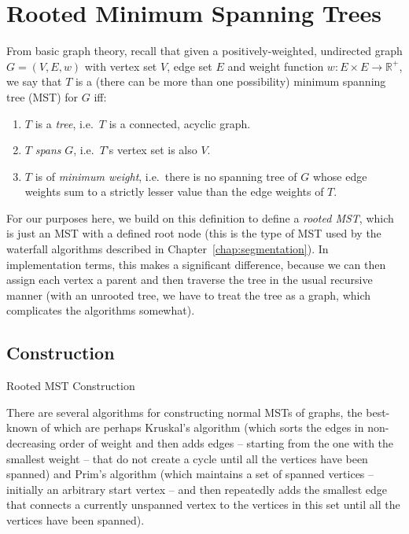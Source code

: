 \afterpage{\clearpage}
\newpage

\section{Rooted Minimum Spanning Trees}

From basic graph theory, recall that given a positively-weighted, undirected graph $G = (V,E,w)$ with vertex set $V$, edge set $E$ and weight function $w: E \times E \to \mathbb{R}^+$, we say that $T$ is a (there can be more than one possibility) minimum spanning tree (MST) for $G$ iff:
%
\begin{enumerate}
\item $T$ is a \emph{tree}, i.e.~$T$ is a connected, acyclic graph.
\item $T$ \emph{spans} $G$, i.e.~$T$'s vertex set is also $V$.
\item $T$ is of \emph{minimum weight}, i.e.~there is no spanning tree of $G$ whose edge weights sum to a strictly lesser value than the edge weights of $T$.
\end{enumerate}
%
For our purposes here, we build on this definition to define a \emph{rooted MST}, which is just an MST with a defined root node (this is the type of MST used by the waterfall algorithms described in Chapter~\ref{chap:segmentation}). In implementation terms, this makes a significant difference, because we can then assign each vertex a parent and then traverse the tree in the usual recursive manner (with an unrooted tree, we have to treat the tree as a graph, which complicates the algorithms somewhat).

\subsection{Construction}

\begin{stulisting}[p]
\caption{Rooted MST Construction}
\label{code:appendixds-rootedmst-construction}

\end{stulisting}

There are several algorithms for constructing normal MSTs of graphs, the best-known of which are perhaps Kruskal's algorithm (which sorts the edges in non-decreasing order of weight and then adds edges -- starting from the one with the smallest weight -- that do not create a cycle until all the vertices have been spanned) and Prim's algorithm (which maintains a set of spanned vertices -- initially an arbitrary start vertex -- and then repeatedly adds the smallest edge that connects a currently unspanned vertex to the vertices in this set until all the vertices have been spanned).

